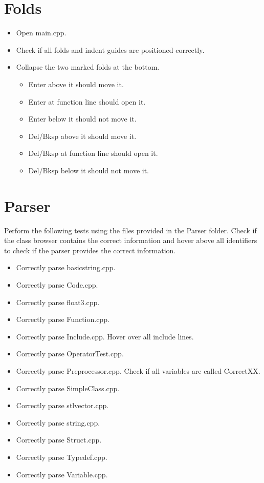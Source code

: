 \documentclass{article}
\begin{document}
\section{Folds}
\begin{itemize}
    \item Open main.cpp.
    \item Check if all folds and indent guides are positioned correctly.
    \item Collapse the two marked folds at the bottom.
    \begin{itemize}
        \item Enter above it should move it.
        \item Enter at function line should open it.
        \item Enter below it should not move it.
        \item Del/Bksp above it should move it.
        \item Del/Bksp at function line should open it.
        \item Del/Bksp below it should not move it.
    \end{itemize}
\end{itemize}

\clearpage
\section{Parser}
Perform the following tests using the files provided in the Parser folder. Check if the class browser contains the correct information and hover above all identifiers to check if the parser provides the correct information.
\begin{itemize}
    \item Correctly parse basic\textunderscore string.cpp.
    \item Correctly parse Code.cpp.
    \item Correctly parse float3.cpp.
    \item Correctly parse Function.cpp.
    \item Correctly parse Include.cpp. Hover over all include lines.
    \item Correctly parse OperatorTest.cpp.
    \item Correctly parse Preprocessor.cpp. Check if all variables are called CorrectXX.
    \item Correctly parse SimpleClass.cpp.
    \item Correctly parse stl\textunderscore vector.cpp.
    \item Correctly parse string.cpp.
    \item Correctly parse Struct.cpp.
    \item Correctly parse Typedef.cpp.
    \item Correctly parse Variable.cpp.
\end{itemize}
\end{document}
